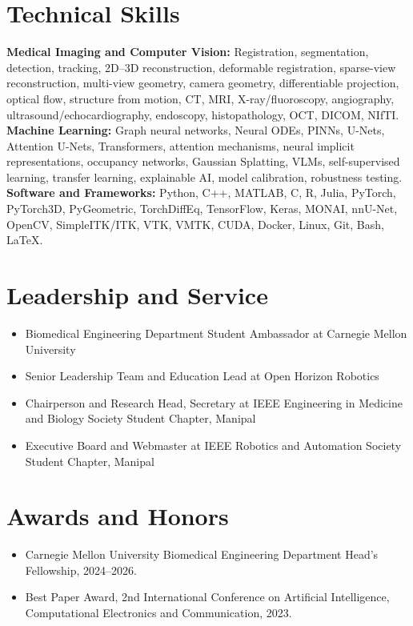 \documentclass[letterpaper,10pt]{article}
\newcommand{\cvItem}[1]{\item\small{#1}}
\newcommand{\cvItemListStart}{
  \begin{itemize}[leftmargin=0.16in, itemsep=1.5pt, parsep=0pt, topsep=2pt]
}
\newcommand{\cvItemListEnd}{
  \end{itemize}
  \vspace{2pt}
}
\begin{document}
\section{Technical Skills}

\small{
\textbf{Medical Imaging and Computer Vision:} Registration, segmentation, detection, tracking, 2D--3D reconstruction, deformable registration, sparse-view reconstruction, multi-view geometry, camera geometry, differentiable projection, optical flow, structure from motion, CT, MRI, X-ray/fluoroscopy, angiography, ultrasound/echocardiography, endoscopy, histopathology, OCT, DICOM, NIfTI. \\[2pt]
\textbf{Machine Learning:} Graph neural networks, Neural ODEs, PINNs, U-Nets, Attention U-Nets, Transformers, attention mechanisms, neural implicit representations, occupancy networks, Gaussian Splatting, VLMs, self-supervised learning, transfer learning, explainable AI, model calibration, robustness testing. \\[2pt]
\textbf{Software and Frameworks:} Python, C++, MATLAB, C, R, Julia, PyTorch, PyTorch3D, PyGeometric, TorchDiffEq, TensorFlow, Keras, MONAI, nnU-Net, OpenCV, SimpleITK/ITK, VTK, VMTK, CUDA, Docker, Linux, Git, Bash, \LaTeX.
}

\section{Leadership and Service}

\cvItemListStart
  \cvItem{{Biomedical Engineering Department Student Ambassador} at Carnegie Mellon University}
  \cvItem{{Senior Leadership Team and Education Lead at Open Horizon Robotics}}
  \cvItem{{Chairperson and Research Head, Secretary at IEEE Engineering in Medicine and Biology Society Student Chapter, Manipal}}
  \cvItem{{Executive Board and Webmaster at IEEE Robotics and Automation Society Student Chapter, Manipal}}
\cvItemListEnd

\section{Awards and Honors}

\cvItemListStart
  \cvItem{Carnegie Mellon University Biomedical Engineering Department Head's Fellowship, 2024--2026.}
    \cvItem{Best Paper Award, 2nd International Conference on Artificial Intelligence, Computational Electronics and Communication, 2023.}
\cvItemListEnd
\end{document}
